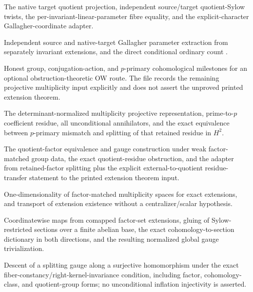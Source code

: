 \documentclass[11pt]{article}
\begin{document}
\begin{description}[style=nextline,leftmargin=0pt]
  The native target quotient projection, independent source/target
  quotient-Sylow twists, the per-invariant-linear-parameter fibre equality,
  and the explicit-character Gallagher-coordinate adapter.
  \item[\path{Character/OkuyamaWajimaParameterCoordinates.lean}]
  Independent source and native-target Gallagher parameter extraction from
  separately invariant extensions, and the direct conditional ordinary
  count .
  \item[\path{Character/OkuyamaWajimaPrintedExtension.lean}]
  Honest group, conjugation-action, and \(p\)-primary cohomological
  milestones for an optional obstruction-theoretic OW route.  The file
  records the remaining
  projective multiplicity input explicitly and does not assert the
  unproved printed extension theorem.
  \item[\path{Character/OkuyamaWajimaPrintedMultiplicityPPrimary.lean}]
  The determinant-normalized multiplicity projective representation,
  prime-to-\(p\) coefficient residue, all unconditional annihilators, and
  the exact equivalence between \(p\)-primary mismatch and splitting of
  that retained residue in \(H^2\).
  \item[\path{Character/OkuyamaWajimaPrintedExtensionFromResidue.lean}]
  The quotient-factor equivalence and gauge construction under weak
  factor-matched group data, the exact quotient-residue obstruction, and
  the adapter from retained-factor splitting plus the explicit
  external-to-quotient residue-transfer statement to the printed extension
  theorem input.
  \item[\path{CharacterTriple/FactorMatchedExtension.lean}]
  One-dimensionality of factor-matched multiplicity spaces for exact
  extensions, and transport of extension existence without a
  centralizer/scalar hypothesis.
  \item[\path{CharacterTriple/FactorSetAbelianSylowGluing.lean}]
  Coordinatewise maps from comapped factor-set extensions, gluing of
  Sylow-restricted sections over a finite abelian base, the exact
  cohomology-to-section dictionary in both directions, and the resulting
  normalized global gauge trivialization.
  \item[\path{CharacterTriple/FactorSetInflationDescent.lean}]
  Descent of a splitting gauge along a surjective homomorphism under the
  exact fiber-constancy/right-kernel-invariance condition, including
  factor, cohomology-class, and quotient-group forms; no unconditional
  inflation injectivity is asserted.

\end{description}
\end{document}
